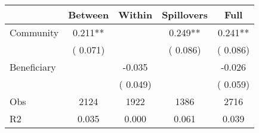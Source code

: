 
\begin{tabular}{l*{4}{c}}\hline&\multicolumn{1}{c}{Between}&\multicolumn{1}{c}{Within}&\multicolumn{1}{c}{Spillovers}&\multicolumn{1}{c}{Full}\\ \hline
 Community             &              0.211**      &                                               &        0.249** &         0.241**                            \\ 
                               &        (       0.071)           &                                       &       (       0.086)     &      (       0.086)                                           \\ 
 Beneficiary   &                                               &       -0.035    &                                &            -0.026                            \\ 
                               &                                               & (       0.049)                  &                                        &      (       0.059)                                           \\ 
\hline                                                                                                                                                                                                                                            
 Obs                   &               2124               &       1922                       &       1386                &              2716                                               \\ 
 R2                    &                      0.035              &              0.000                      &              0.061               &                     0.039                                              \\ 
\hline \end{tabular}                                                                                                                                                                                                              